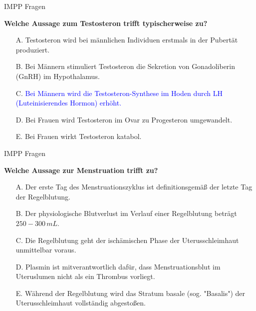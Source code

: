 \documentclass{beamer}
\begin{document}
\begin{frame}{IMPP Fragen}
    
\textbf{Welche Aussage zum Testosteron trifft typischerweise zu?} \\[0.2 cm]

\begin{itemize}
\item[A.] Testosteron wird bei männlichen Individuen erstmals in der Pubertät produziert.
\item[B.] Bei Männern stimuliert Testosteron die Sekretion von Gonadoliberin (GnRH) im Hypothalamus.
\item[C.] \textcolor{blue}{Bei Männern wird die Testosteron-Synthese im Hoden durch LH (Luteinisierendes Hormon) erhöht.} %
\item[D.] Bei Frauen wird Testosteron im Ovar zu Progesteron umgewandelt.
\item[E.] Bei Frauen wirkt Testosteron katabol.

\end{itemize}

\end{frame}



\begin{frame}{IMPP Fragen}
    
\textbf{Welche Aussage zur Menstruation trifft zu?} \\[0.2 cm]

\begin{itemize}
\item[A.] Der erste Tag des Menstruationszyklus ist definitionsgemäß der letzte Tag der Regelblutung.
\item[B.] Der physiologische Blutverlust im Verlauf einer Regelblutung beträgt \(250-300\,mL\).
\item[C.] Die Regelblutung geht der ischämischen Phase der Uterusschleimhaut unmittelbar voraus. 
\item[D.] Plasmin ist mitverantwortlich dafür, dass Menstruationsblut im Uteruslumen nicht als ein Thrombus vorliegt. %
\item[E.] Während der Regelblutung wird das Stratum basale (sog. "Basalis") der Uterusschleimhaut vollständig abgestoßen.

\end{itemize}

\end{frame}
\end{document}
